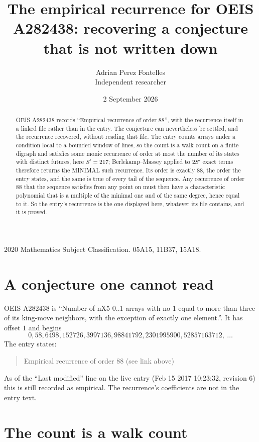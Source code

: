\documentclass[11pt,a4paper]{article}
\title{The empirical recurrence for OEIS A282438: recovering a conjecture that is not written down}
\author{Adrian Perez Fontelles\\ \small Independent researcher}
\date{2 September 2026}
\theoremstyle{plain}
\theoremstyle{definition}
\begin{document}
\maketitle

\begin{abstract}
OEIS A282438 records ``Empirical recurrence of order $88$'', with the recurrence itself in a
linked file rather than in the entry. The conjecture can nevertheless be settled, and the
recurrence recovered, without reading that file. The entry counts arrays under a condition
local to a bounded window of lines, so the count is a walk count on a finite digraph and
satisfies some monic recurrence of order at most the number of its states with distinct
futures, here $S'=217$; Berlekamp--Massey applied to $2S'$ exact
terms therefore returns the MINIMAL such recurrence. Its order is exactly $88$, the order
the entry states, and the same is true of every tail of the sequence. Any recurrence of order
$88$ that the sequence satisfies from any point on must then have a characteristic
polynomial that is a multiple of the minimal one and of the same degree, hence equal to it. So
the entry's recurrence is the one displayed here, whatever its file contains, and it is
proved.
\end{abstract}

\noindent\small 2020 Mathematics Subject Classification. 05A15, 11B37, 15A18.\normalsize

\section{A conjecture one cannot read}

OEIS A282438 is ``Number of nX5 0..1 arrays with no 1 equal to more than three of its king-move neighbors, with the exception of exactly one element.''. It has offset $1$ and begins
\[
0, 58, 6498, 152726, 3997136, 98841792, 2301995900, 52857163712,\ \dots
\]
The entry states:
\begin{quote}
Empirical recurrence of order 88 (see link above)
\end{quote}
As of the ``Last modified'' line on the live entry (Feb 15 2017 10:23:32, revision 6) this is still
recorded as empirical. The recurrence's coefficients are not in the entry text.

\section{The count is a walk count}
\end{document}
